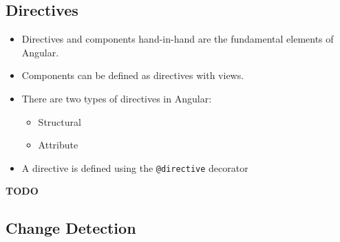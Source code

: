 \documentclass[12pt,]{article}
\providecommand{\tightlist}{%
  \setlength{\itemsep}{0pt}\setlength{\parskip}{0pt}}
\begin{document}
\subsection{Directives}\label{directives}

\begin{itemize}
\tightlist
\item
  Directives and components hand-in-hand are the fundamental elements of
  Angular.
\item
  Components can be defined as directives with views.
\item
  There are two types of directives in Angular:

  \begin{itemize}
  \tightlist
  \item
    Structural
  \item
    Attribute
  \end{itemize}
\item
  A directive is defined using the \texttt{@directive} decorator
\end{itemize}

\textbf{TODO}

\subsection{Change Detection}\label{change-detection}
\end{document}
